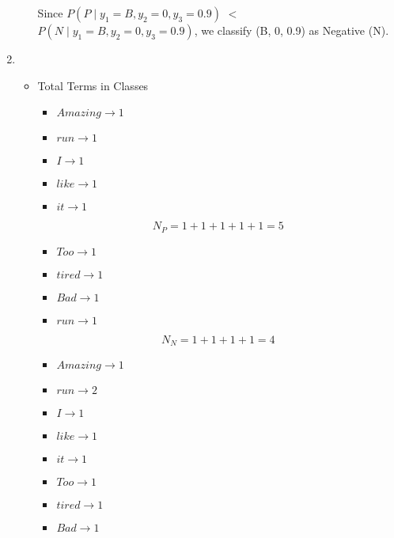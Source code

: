 \documentclass[12pt]{article}
\begin{document}
\begin{enumerate}[leftmargin=\labelsep, label=\textbf{\arabic*.)}]
\begin{itemize}
                    Since \( P(P \mid y_1 = B, y_2 = 0, y_3 = 0.9) \) \(<\) \( P(N \mid y_1 = B, y_2 = 0, y_3 = 0.9) \), we classify (B, 0, 0.9) as Negative (N).
          \end{itemize}
          \vspace{0.5em}

    \item \begin{itemize}
              \item Total Terms in Classes

                    \begin{itemize}
                        \item \( Amazing \rightarrow 1\)
                        \item \( run \rightarrow 1\)
                        \item \( I \rightarrow 1\)
                        \item \( like \rightarrow 1\)
                        \item \( it \rightarrow 1\)
                    \end{itemize}

                    \[
                        N_P = 1 + 1 + 1 + 1 + 1 = 5
                    \]

                    \begin{itemize}
                        \item \( Too \rightarrow 1\)
                        \item \( tired \rightarrow 1\)
                        \item \( Bad \rightarrow 1\)
                        \item \( run \rightarrow 1\)
                    \end{itemize}

                    \[
                        N_N = 1 + 1 + 1 + 1 = 4
                    \]

                    \begin{itemize}
                        \item \( Amazing \rightarrow 1\)
                        \item \( run \rightarrow 2\)
                        \item \( I \rightarrow 1\)
                        \item \( like \rightarrow 1\)
                        \item \( it \rightarrow 1\)
                        \item \( Too \rightarrow 1\)
                        \item \( tired \rightarrow 1\)
                        \item \( Bad \rightarrow 1\)
                    \end{itemize}


\end{itemize}
\end{enumerate}
\end{document}
